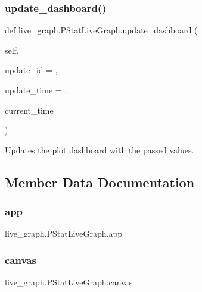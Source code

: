 \subsubsection{\texorpdfstring{update\+\_\+dashboard()}{update\_dashboard()}}
{\footnotesize\ttfamily def live\+\_\+graph.\+P\+Stat\+Live\+Graph.\+update\+\_\+dashboard (\begin{DoxyParamCaption}\item[{}]{self,  }\item[{}]{update\+\_\+id = {},  }\item[{}]{update\+\_\+time = {},  }\item[{}]{current\+\_\+time = {} }\end{DoxyParamCaption})}

\begin{DoxyVerb}Updates the plot dashboard with the passed values.
\end{DoxyVerb}
 

\subsection{Member Data Documentation}
\mbox{\label{classlive__graph_1_1PStatLiveGraph_ad6b3c5024c9472884e04570fd1890f17}} 
\subsubsection{\texorpdfstring{app}{app}}
{\footnotesize\ttfamily live\+\_\+graph.\+P\+Stat\+Live\+Graph.\+app}

\mbox{\label{classlive__graph_1_1PStatLiveGraph_aeed29aeb8e32076da7227cbbda1902ca}} 
\subsubsection{\texorpdfstring{canvas}{canvas}}
{\footnotesize\ttfamily live\+\_\+graph.\+P\+Stat\+Live\+Graph.\+canvas}


